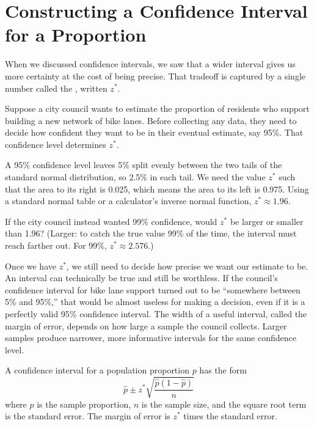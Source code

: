 \section{Constructing a Confidence Interval for a Proportion}

When we discussed confidence intervals, we saw that a wider interval gives us
more certainty at the cost of being precise. That tradeoff is captured by
a single number called the ,
written $z^*$.

Suppose a city council wants to estimate the proportion of residents who
support building a new network of bike lanes. Before collecting any data,
they need to decide how confident they want to be in their eventual
estimate, say 95\%. That confidence level determines $z^*$.

A 95\% confidence level leaves 5\% split evenly between the two tails of the
standard normal distribution, so 2.5\% in each tail. We need the value
$z^*$ such that the area to its right is 0.025, which means the area to its
left is 0.975. Using a standard normal table or a calculator's inverse
normal function, $z^* \approx 1.96$.

If the city council instead wanted 99\% confidence, would $z^*$ be larger
or smaller than 1.96? (Larger: to catch the true value 99\% of the time,
the interval must reach farther out. For 99\%, $z^* \approx 2.576$.)

Once we have $z^*$, we still need to decide how precise we want our estimate
to be. An interval can technically be true and still be worthless. If the
council's confidence interval for bike lane support turned out to be
``somewhere between 5\% and 95\%,'' that would be almost useless for making a
decision, even if it is a perfectly valid 95\% confidence interval. The
width of a useful interval, called the margin of error, depends on how large
a sample the council collects. Larger samples produce narrower, more
informative intervals for the same confidence level.

A confidence interval for a population proportion $p$ has the form
$$\hat{p} \pm z^* \sqrt{\frac{\hat{p}(1 - \hat{p})}{n}}$$
where $\hat{p}$ is the sample proportion, $n$ is the sample size, and the square root term is the standard error. The margin of error is $z^*$ times the standard error.

